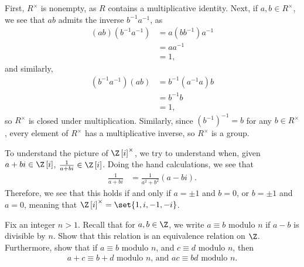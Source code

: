 \documentclass[10pt]{mypackage}
\begin{document}
\begin{solution}
  First, $R^{\times}$ is nonempty, as $R$ contains a multiplicative identity. Next, if $a,b\in R^{\times}$, we see that $ab$ admits the inverse $b^{-1}a^{-1}$, as
  \begin{align*}
    \left( ab \right)\left( b^{-1}a^{-1} \right) &= a\left( bb^{-1} \right)a^{-1}\\
                                                 &= aa^{-1}\\
                                                 &= 1,
  \end{align*}
  and similarly,
  \begin{align*}
    \left( b^{-1}a^{-1} \right)\left( ab \right) &= b^{-1}\left( a^{-1}a \right)b\\
                                                 &= b^{-1}b\\
                                                 &= 1,
  \end{align*}
  so $R^{\times}$ is closed under multiplication. Similarly, since $\left( b^{-1} \right)^{-1} = b$ for any $b\in R^{\times}$, every element of $R^{\times}$ has a multiplicative inverse, so $R^{\times}$ is a group.\newline

  To understand the picture of $\Z\left[ i \right]^{\times}$, we try to understand when, given $a+bi\in \Z\left[ i \right]$, $\frac{1}{a+bi}\in \Z\left[ i \right]$. Doing the hand calculations, we see that
  \begin{align*}
    \frac{1}{a+bi} &= \frac{1}{a^2+b^2} \left( a-bi \right).
  \end{align*}
  Therefore, we see that this holds if and only if $a=\pm 1$ and $b = 0$, or $b = \pm 1$ and $a = 0$, meaning that $\Z\left[ i \right]^{\times} = \set{1,i,-1,-i}$.
\end{solution}
\begin{problem}[Problem 3]
  Fix an integer $n > 1$. Recall that for $a,b\in \Z$, we write $a \equiv b$ modulo $n$ if $a-b$ is divisible by $n$. Show that this relation is an equivalence relation on $\Z$. Furthermore, show that if $a\equiv b$ modulo $n$, and $c\equiv d$ modulo $n$, then
  \begin{align*}
    a+c \equiv b+d\text{ modulo $n$, and } ac\equiv bd\text{ modulo $n$.}
  \end{align*}
\end{problem}
\end{document}
